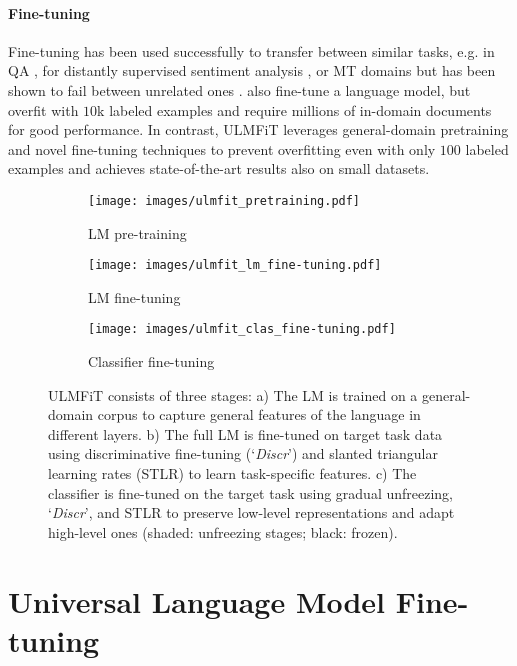 \documentclass[11pt,a4paper]{article}
\begin{document}
\paragraph{Fine-tuning} Fine-tuning has been used successfully to transfer between similar tasks, e.g. in QA \cite{Min2017}, for distantly supervised sentiment analysis \cite{Severyn2015a}, or MT domains \cite{sennrich2015improving} but has been shown to fail between unrelated ones \cite{Mou2016}.  also fine-tune a language model, but overfit with $10$k labeled examples and require millions of in-domain documents for good performance. In contrast, ULMFiT leverages general-domain pretraining and novel fine-tuning techniques to prevent overfitting even with only $100$ labeled examples and achieves state-of-the-art results also on small datasets.


\begin{figure*}[!htb]
\begin{subfigure}{.30\linewidth}
      \centering
         \texttt{[image: images/ulmfit\_pretraining.pdf]}
    \caption{LM pre-training} \label{fig:lm-pretraining}
    \end{subfigure}\hspace*{0.4cm}
    \begin{subfigure}{.30\linewidth}
      \centering
         \texttt{[image: images/ulmfit\_lm\_fine-tuning.pdf]}
    \caption{LM fine-tuning} \label{fig:lm-fine-tuning}
    \end{subfigure}
    \hspace*{0.4cm}
    \begin{subfigure}{.30\linewidth}
      \centering
         \texttt{[image: images/ulmfit\_clas\_fine-tuning.pdf]}
    \caption{Classifier fine-tuning} \label{fig:classifier-fine-tuning}
    \end{subfigure}
    \caption{ULMFiT consists of three stages: a) The LM is trained on a general-domain corpus to capture general features of the language in different layers. b) The full LM is fine-tuned on target task data using discriminative fine-tuning (`\emph{Discr}') and slanted triangular learning rates (STLR) to learn task-specific features. c) The classifier is fine-tuned on the target task using gradual unfreezing, `\emph{Discr}', and STLR to preserve low-level representations and adapt high-level ones (shaded: unfreezing stages; black: frozen).}
\label{fig:ulmfit}
\end{figure*}

\section{Universal Language Model Fine-tuning}
\end{document}
